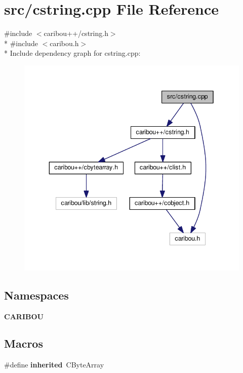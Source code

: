 \section{src/cstring.cpp File Reference}
\label{cstring_8cpp}
{\ttfamily \#include $<$caribou++/cstring.\-h$>$}\\*
{\ttfamily \#include $<$caribou.\-h$>$}\\*
Include dependency graph for cstring.\-cpp\-:\nopagebreak
\begin{figure}[H]
\begin{center}
\leavevmode
\includegraphics[width=339pt]{cstring_8cpp__incl}
\end{center}
\end{figure}
\subsection*{Namespaces}
\begin{DoxyCompactItemize}
\item 
{\bf C\-A\-R\-I\-B\-O\-U}
\end{DoxyCompactItemize}
\subsection*{Macros}
\begin{DoxyCompactItemize}
\item 
\#define {\bf inherited}~C\-Byte\-Array
\end{DoxyCompactItemize}


